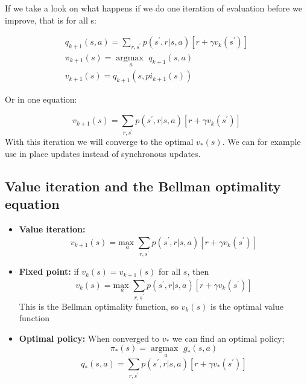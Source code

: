 If we take a look on what happens if we do one iteration of evaluation before we improve, that is for all s:

	\begin{equation}
	\begin{aligned}
		q_{k+1}(s,a) = \sum_{r, s^{\prime}}^{}p(s^{\prime},r|s,a)[r + \gamma v_k(s^{\prime})] \\
		\pi_{k+1}(s) = \underset{a}{\arg \text{max }} q_{k+1}(s,a) \\
		v_{k+1}(s) = q_{k+1}(s, pi_{k+1}(s))
	\end{aligned}
	\end{equation}

Or in one equation:

	\begin{equation}
		v_{k+1}(s) = \sum_{r, s^{\prime}}^{}p(s^{\prime},r|s,a)[r + \gamma v_k(s^{\prime})]
	\end{equation}
With this iteration we will converge to the optimal $v_*(s)$. We can for example use in place updates instead of synchronous updates. 


\subsection{Value iteration and the Bellman optimality equation}

\begin{itemize}
	\item \textbf{Value iteration:} 
		\begin{equation}
			v_{k+1}(s) = \underset{a}{\text{max }}\sum_{r, s^{\prime}}^{}p(s^{\prime},r|s,a)[r + \gamma v_k(s^{\prime})]
		\end{equation}
	\item \textbf{Fixed point: } if $v_k(s) = v_{k+1}(s)$ for all $s$, then
		\begin{equation}
			v_{k}(s) = \underset{a}{\text{max }}\sum_{r, s^{\prime}}^{}p(s^{\prime},r|s,a)[r + \gamma v_k(s^{\prime})]
		\end{equation}
		This is the Bellman optimality function, so $v_k(s)$ is the optimal value function
	\item \textbf{Optimal policy: } When converged to $v_*$ we can find an optimal policy;
		\begin{equation}
			\pi_*(s) = \underset{a}{\arg \text{max }} g_*(s,a)
		\end{equation}
		\begin{equation}
			q_* (s,a) = \sum_{r, s^{\prime}}^{}p(s^{\prime},r|s,a)[r+\gamma v_*(s^{\prime})] 
		\end{equation}
\end{itemize}

